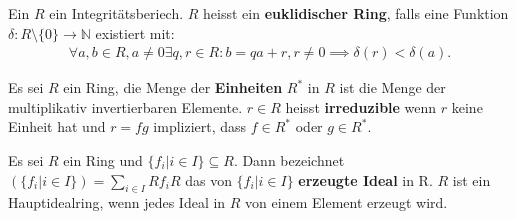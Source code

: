 \documentclass[../Algebra_script.tex]{subfiles}
\begin{document}
    \begin{definition}
        Ein $R$ ein Integritätsberiech. $R$ heisst ein \textbf{euklidischer Ring}, falls eine Funktion $\delta: R \setminus \{0\} \to \mathbb{N}$ existiert mit:
        \begin{align*}
            \forall a, b \in R, a \neq 0 \exists q, r \in R: b = qa + r, r \neq 0 \implies \delta(r) < \delta(a)
        .\end{align*}
    \end{definition}

    \begin{definition}
        Es sei $R$ ein Ring, die Menge der \textbf{Einheiten} $R^*$ in $R$ ist die Menge der multiplikativ invertierbaren Elemente.
        $r \in R$ heisst \textbf{irreduzible} wenn $r$ keine Einheit hat und $r = fg$ impliziert, dass $f \in R^*$ oder $g \in R^*$.
    \end{definition}

    \begin{definition}
        Es sei $R$ ein Ring und $\{f_{i}| i \in I\} \subseteq R$. Dann bezeichnet $(\{f_{i} | i \in I\}) = \sum_{i \in I}^{} Rf_{i}R$ das von $\{f_{i} | i \in
        I\}$ \textbf{erzeugte Ideal} in R.
        $R$ ist ein Hauptidealring, wenn jedes Ideal in $R$ von einem Element erzeugt wird.
    \end{definition}
\end{document}
